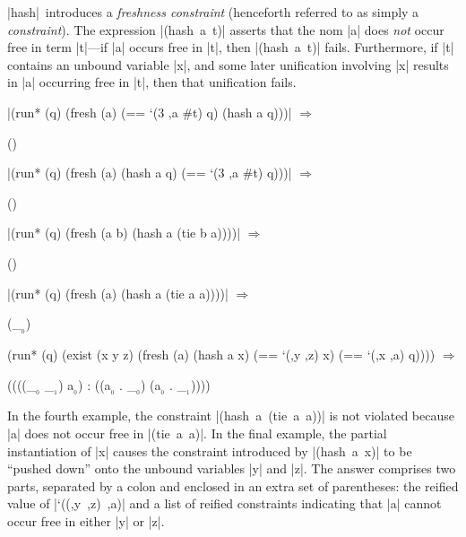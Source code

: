 \scheme|hash|~introduces a \emph{freshness constraint} (henceforth referred to as simply a \emph{constraint}).  The expression \mbox{\scheme|(hash a t)|}
asserts that the nom \scheme|a| does \emph{not} occur free in term
\scheme|t|---if \scheme|a| occurs free in \scheme|t|, then
\mbox{\scheme|(hash a t)|} fails.  Furthermore, if \scheme|t| contains
an unbound variable \scheme|x|, and some later unification 
involving \scheme|x| results in
\scheme|a| occurring free in \scheme|t|, then that unification fails.

\wspace

\noindent\scheme|(run* (q) (fresh (a) (== `(3 ,a #t) q) (hash a q)))| $\Rightarrow$ \begin{schemeresponsebox}()\end{schemeresponsebox}

\tspace

\noindent\scheme|(run* (q) (fresh (a) (hash a q) (== `(3 ,a #t) q)))| $\Rightarrow$ \begin{schemeresponsebox}()\end{schemeresponsebox}

\tspace

\noindent\scheme|(run* (q) (fresh (a b) (hash a (tie b a))))| $\Rightarrow$ \begin{schemeresponsebox}()\end{schemeresponsebox}

\tspace

\noindent\scheme|(run* (q) (fresh (a) (hash a (tie a a))))| $\Rightarrow$ \begin{schemeresponsebox}(_$_{_{0}}$)\end{schemeresponsebox}


\begin{schemedisplay}
(run* (q)
  (exist (x y z)
    (fresh (a)      
      (hash a x)
      (== `(,y ,z) x)
      (== `(,x ,a) q)))) $\Rightarrow$
\end{schemedisplay}
\nspace
\begin{schemeresponse}
((((_$_{_{0}}$ _$_{_{1}}$) a$_{_{0}}$) : ((a$_{_{0}}$ . _$_{_{0}}$) (a$_{_{0}}$ . _$_{_{1}}$))))
\end{schemeresponse}

\noindent In the fourth example, the constraint \mbox{\scheme|(hash a (tie a a))|} is not violated because \scheme|a| does not occur free in \mbox{\scheme|(tie a a)|}.  
In the final example, the partial instantiation of \scheme|x| causes the constraint introduced by
\mbox{\scheme|(hash a x)|} to be ``pushed down'' onto the unbound variables
\scheme|y| and \scheme|z|.  The
answer comprises two parts, separated by a colon and enclosed in an
extra set of parentheses: the reified value of \mbox{\scheme|`((,y ,z) ,a)|}
and a list of reified constraints indicating that
\scheme|a| cannot occur free in either \scheme|y| or \scheme|z|.

